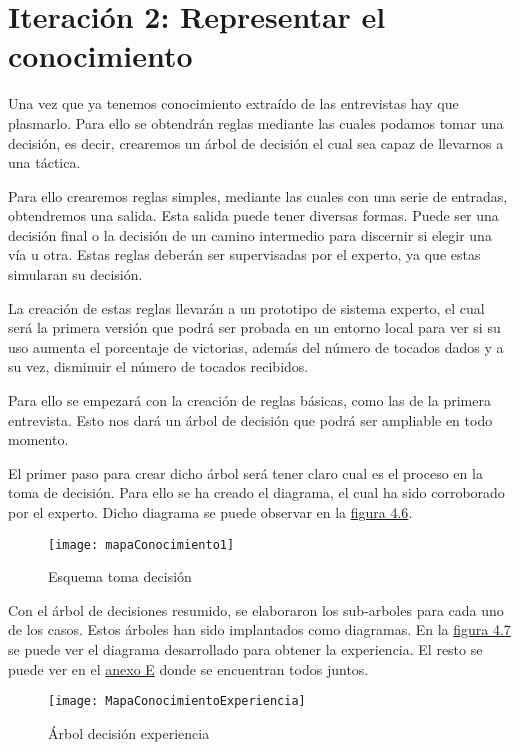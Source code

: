 \section{Iteración 2: Representar el conocimiento}

Una vez que ya tenemos conocimiento extraído de las entrevistas hay que plasmarlo.
Para ello se obtendrán reglas mediante las cuales podamos tomar una decisión, es decir,
crearemos un árbol de decisión el cual sea capaz de llevarnos a una táctica.

Para ello crearemos reglas simples, mediante las cuales con una serie de entradas,
obtendremos una salida. Esta salida puede tener diversas formas. Puede ser una decisión final
o la decisión de un camino intermedio para discernir si elegir una vía u otra.
Estas reglas deberán ser supervisadas por el experto, ya que estas simularan su decisión.

La creación de estas reglas llevarán a un prototipo de sistema experto, el cual será
la primera versión que podrá ser probada en un entorno local para ver si su uso aumenta
el porcentaje de victorias, además del número de tocados dados y a su vez, disminuir el
número de tocados recibidos.

Para ello se empezará con la creación de reglas básicas, como las de la primera entrevista. Esto
nos dará un árbol de decisión que podrá ser ampliable en todo momento.

El primer paso para crear dicho árbol será tener claro cual es el proceso en la toma de decisión.
Para ello se ha creado el diagrama, el cual ha sido corroborado por el experto. Dicho diagrama
se puede observar en la \hyperref[fig:Esquema toma decisión]{figura 4.6}.

\begin{figure}[htb]
  \centering
    \texttt{[image: mapaConocimiento1]}
  \caption[Esquema toma decisión]{Esquema toma decisión}
  \label{fig:Esquema toma decisión}
\end{figure}


Con el árbol de decisiones resumido, se elaboraron los sub-arboles para cada uno de los casos.
Estos árboles han sido implantados como diagramas. En la \hyperref[fig:Arbol decisión experiencia]{figura 4.7} se puede ver el diagrama
desarrollado para obtener la experiencia. El resto se puede ver en el \hyperref[cap:Diagramas mapas conocimiento]{anexo E} donde se encuentran
todos juntos.

\begin{figure}[htb]
  \centering
    \texttt{[image: MapaConocimientoExperiencia]}
  \caption[Árbol decisión experiencia]{Árbol decisión experiencia}
  \label{fig:Arbol decisión experiencia}
\end{figure}

